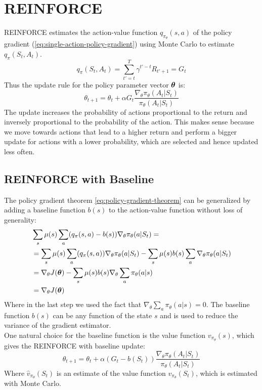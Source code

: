 \section{REINFORCE}
REINFORCE estimates the action-value function $q_{\pi_{\theta}}(s, a)$ of the policy gradient (\ref{eq:single-action-policy-gradient}) using Monte Carlo to estimate $q_{\pi}(S_t, A_t)$.
\begin{equation}
    q_{\pi}(S_t, A_t) = \sum_{t'=t}^T \gamma^{t'-t} R_{t' + 1} = G_t
\end{equation}
Thus the update rule for the policy parameter vector $\boldsymbol{\theta}$ is:
\begin{equation}
    \theta_{t+1} = \theta_t + \alpha G_t \frac{\nabla_{\theta} \pi_{\theta}(A_t|S_t)}{\pi_{\theta}(A_t|S_t)}
    \label{eq:reinforce-update}
\end{equation}
The update increases the probability of actions proportional to the return and inversely proportional to the probability of the action. This makes sense because we move towards actions that lead to a higher return and perform a bigger update for actions with a lower probability, which are selected and hence updated less often.

\subsection{REINFORCE with Baseline}
The policy gradient theorem \eqref{eq:policy-gradient-theorem} can be generalized by adding a baseline function $b(s)$ to the action-value function without loss of generality:
\begin{equation}
    \begin{split}
        & \sum_s \mu(s) \sum_a (q_{\pi}(s, a) - b(s)) \nabla_{\theta}\pi_{\theta}(a|S_t) = \\
        & = \sum_s \mu(s) \sum_a (q_{\pi}(s, a)) \nabla_{\theta}\pi_{\theta}(a|S_t) - \sum_s \mu(s) b(s) \sum_a \nabla_{\theta}\pi_{\theta}(a|S_t)\\
        & = \nabla_{\theta} J(\boldsymbol{\theta}) - \sum_s \mu(s) b(s) \nabla_{\theta} \sum_a \pi_{\theta}(a|s)\\
        & = \nabla_{\theta} J(\boldsymbol{\theta})
    \end{split}
    \label{eq:policy-gradient-theorem-generalized}
\end{equation}
Where in the last step we used the fact that $\nabla_{\theta} \sum_a \pi_{\theta}(a|s) = 0$. The baseline function $b(s)$ can be any function of the state $s$ and is used to reduce the variance of the gradient estimator.\\
One natural choice for the baseline function is the value function $v_{\pi_{\theta}}(s)$, which gives the REINFORCE with baseline update:
\begin{equation}
    \theta_{t+1} = \theta_t + \alpha (G_t - b(S_t)) \frac{\nabla_{\theta} \pi_{\theta}(A_t|S_t)}{\pi_{\theta}(A_t|S_t)}
    \label{eq:reinforce-with-baseline-update}
\end{equation}
Where $\hat{v}_{\pi_{\theta}}(S_t)$ is an estimate of the value function $v_{\pi_{\theta}}(S_t)$, which is estimated with Monte Carlo.

